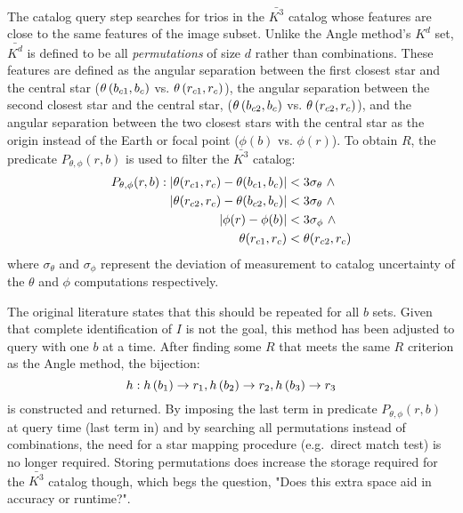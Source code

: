 The catalog query step searches for trios in the $\bar{K^3}$ catalog whose features are close to the same features of
the image subset.
Unlike the Angle method's $K^d$ set, $\bar{K^d}$ is defined to be all \textit{permutations} of size $d$ rather than
combinations.
These features are defined as the angular separation between the first closest star and the central star
($\theta\left(b_{c1}, b_c\right)$ vs. $ \theta\left(r_{c1}, r_c\right)$), the
angular separation between the second closest star and the central star, ($\theta\left(b_{c2},
b_c\right) $ vs. $\theta\left(r_{c2}, r_c\right)$),
and the angular separation between the two closest stars with the central star as the origin instead of the Earth or 
focal point ($\phi(b) $ vs. $ \phi(r)$).
To obtain $R$, the predicate $P_{\theta, \phi}(r, b)$ is used to filter the $\bar{K^3}$ catalog:
\begin{equation}
    \begin{aligned}
        P_{\theta, \phi} (r, b): \left\lvert \theta(r_{c1}, r_c) - \theta(b_{c1}, b_c)\right\rvert
        &< 3 \sigma_{\theta} \ \land \\ \left\lvert \theta(r_{c2}, r_c) - \theta(b_{c2}, 
        b_c)\right\rvert &< 3 \sigma_{\theta} \ \land \\ \left\lvert \phi(r) - \phi(b)\right\rvert &< 3 
        \sigma_\phi \ \land \\\theta(r_{c1}, r_c) &< \theta(r_{c2}, r_c)
    \end{aligned}
\end{equation}
where $\sigma_{\theta}$ and $\sigma_{\phi}$ represent the deviation of measurement to catalog uncertainty of the
$\theta$ and $\phi$ computations respectively.

The original literature states that this should be repeated for all $b$ sets.
Given that complete identification of $I$ is not the goal, this method has been adjusted to query with one $b$ at a
time.
After finding some $R$ that meets the same $R$ criterion as the Angle method, the bijection:
\begin{equation}
    h: h\left(b_1\right) \rightarrow r_1, h\left(b_2\right) \rightarrow r_2, h\left(b_3\right)
    \rightarrow r_3
\end{equation}
is constructed and returned.
By imposing the last term in predicate $P_{\theta, \phi}(r, b)$ at query time (last term in) and by searching all
permutations instead of combinations, the need for a star mapping procedure (e.g.\ direct match test) is
no longer required.
Storing permutations does increase the storage required for the $\bar{K^3}$ catalog though, which begs the question,
"Does this extra space aid in accuracy or runtime?".

